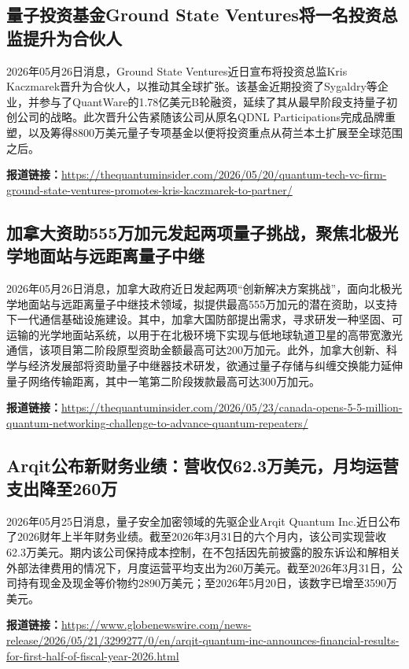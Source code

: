 \documentclass[12pt,a4paper]{ctexart}
\begin{document}
\subsection{ 量子投资基金Ground State Ventures将一名投资总监提升为合伙人 }

2026年05月26日消息，Ground State Ventures近日宣布将投资总监Kris Kaczmarek晋升为合伙人，以推动其全球扩张。该基金近期投资了Sygaldry等企业，并参与了QuantWare的1.78亿美元B轮融资，延续了其从最早阶段支持量子初创公司的战略。此次晋升公告紧随该公司从原名QDNL Participations完成品牌重塑，以及筹得8800万美元量子专项基金以便将投资重点从荷兰本土扩展至全球范围之后。

\noindent\textbf{报道链接：}\url{https://thequantuminsider.com/2026/05/20/quantum-tech-vc-firm-ground-state-ventures-promotes-kris-kaczmarek-to-partner/ }

\subsection{ 加拿大资助555万加元发起两项量子挑战，聚焦北极光学地面站与远距离量子中继 }

2026年05月26日消息，加拿大政府近日发起两项“创新解决方案挑战”，面向北极光学地面站与远距离量子中继技术领域，拟提供最高555万加元的潜在资助，以支持下一代通信基础设施建设。其中，加拿大国防部提出需求，寻求研发一种坚固、可运输的光学地面站系统，以用于在北极环境下实现与低地球轨道卫星的高带宽激光通信，该项目第二阶段原型资助金额最高可达200万加元。此外，加拿大创新、科学与经济发展部将资助量子中继器技术研发，欲通过量子存储与纠缠交换能力延伸量子网络传输距离，其中一笔第二阶段拨款最高可达300万加元。

\noindent\textbf{报道链接：}\url{https://thequantuminsider.com/2026/05/23/canada-opens-5-5-million-quantum-networking-challenge-to-advance-quantum-repeaters/ }

\subsection{ Arqit公布新财务业绩：营收仅62.3万美元，月均运营支出降至260万 }

2026年05月25日消息，量子安全加密领域的先驱企业Arqit Quantum Inc.近日公布了2026财年上半年财务业绩。截至2026年3月31日的六个月内，该公司实现营收62.3万美元。期内该公司保持成本控制，在不包括因先前披露的股东诉讼和解相关外部法律费用的情况下，月度运营平均支出为260万美元。截至2026年3月31日，公司持有现金及现金等价物约2890万美元；至2026年5月20日，该数字已增至3590万美元。

\noindent\textbf{报道链接：}\url{https://www.globenewswire.com/news-release/2026/05/21/3299277/0/en/arqit-quantum-inc-announces-financial-results-for-first-half-of-fiscal-year-2026.html }
\end{document}
